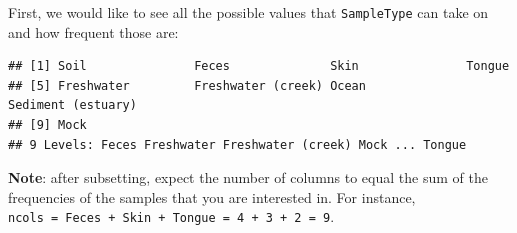 \documentclass[
]{book}
\newenvironment{Shaded}{\begin{snugshade}}{\end{snugshade}}
\newcommand{\CommentTok}[1]{\textcolor[rgb]{0.56,0.35,0.01}{\textit{#1}}}
\newcommand{\FunctionTok}[1]{\textcolor[rgb]{0.00,0.00,0.00}{#1}}
\newcommand{\NormalTok}[1]{#1}
\newcommand{\SpecialCharTok}[1]{\textcolor[rgb]{0.00,0.00,0.00}{#1}}
\begin{document}
First, we would like to see all the possible values that \texttt{SampleType} can take on and how frequent those are:

\begin{Shaded}
\end{Shaded}

\begin{verbatim}
## [1] Soil               Feces              Skin               Tongue            
## [5] Freshwater         Freshwater (creek) Ocean              Sediment (estuary)
## [9] Mock              
## 9 Levels: Feces Freshwater Freshwater (creek) Mock ... Tongue
\end{verbatim}

\begin{Shaded}
\end{Shaded}

\begin{table}
\centering
{}
\end{table}

\textbf{Note}: after subsetting, expect the number of columns to equal the
sum of the frequencies of the samples that you are interested
in. For instance, \texttt{ncols\ =\ Feces\ +\ Skin\ +\ Tongue\ =\ 4\ +\ 3\ +\ 2\ =\ 9}.
\end{document}
